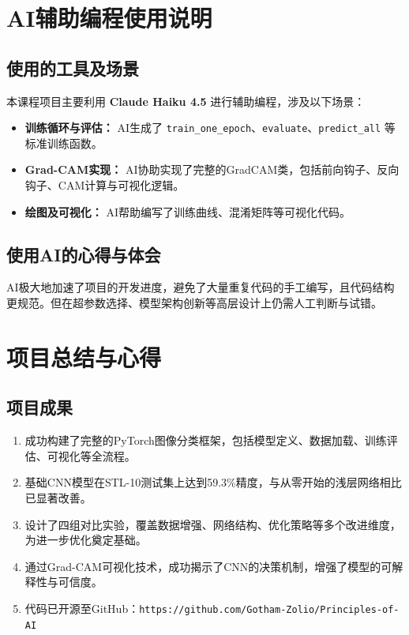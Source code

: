 \documentclass[12pt,a4paper]{ctexart}
\begin{document}
\section{AI辅助编程使用说明}

\subsection{使用的工具及场景}
本课程项目主要利用 \textbf{Claude Haiku 4.5} 进行辅助编程，涉及以下场景：

\begin{itemize}    
    \item \textbf{训练循环与评估：} AI生成了 \texttt{train\_one\_epoch}、\texttt{evaluate}、\texttt{predict\_all} 等标准训练函数。
    
    \item \textbf{Grad-CAM实现：} AI协助实现了完整的GradCAM类，包括前向钩子、反向钩子、CAM计算与可视化逻辑。
    
    \item \textbf{绘图及可视化：} AI帮助编写了训练曲线、混淆矩阵等可视化代码。
\end{itemize}

\subsection{使用AI的心得与体会}
AI极大地加速了项目的开发进度，避免了大量重复代码的手工编写，且代码结构更规范。但在超参数选择、模型架构创新等高层设计上仍需人工判断与试错。

\section{项目总结与心得}

\subsection{项目成果}
\begin{enumerate}
    \item 成功构建了完整的PyTorch图像分类框架，包括模型定义、数据加载、训练评估、可视化等全流程。
    
    \item 基础CNN模型在STL-10测试集上达到59.3\%精度，与从零开始的浅层网络相比已显著改善。
    
    \item 设计了四组对比实验，覆盖数据增强、网络结构、优化策略等多个改进维度，为进一步优化奠定基础。
    
    \item 通过Grad-CAM可视化技术，成功揭示了CNN的决策机制，增强了模型的可解释性与可信度。
    
    \item 代码已开源至GitHub：\texttt{https://github.com/Gotham-Zolio/Principles-of-AI}
\end{enumerate}
\end{document}
